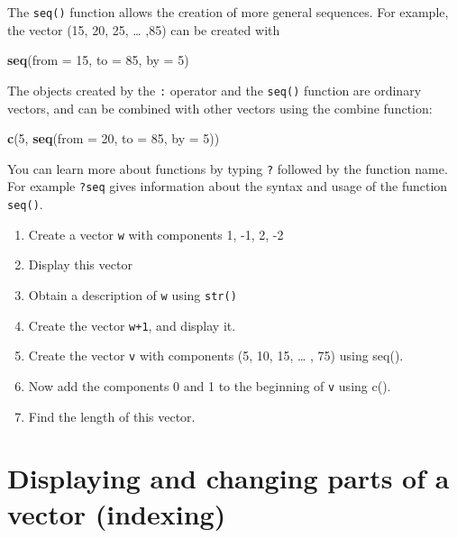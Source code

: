 \documentclass[
]{book}
\newenvironment{Shaded}{\begin{snugshade}}{\end{snugshade}}
\newcommand{\AttributeTok}[1]{\textcolor[rgb]{0.13,0.29,0.53}{#1}}
\newcommand{\DecValTok}[1]{\textcolor[rgb]{0.00,0.00,0.81}{#1}}
\newcommand{\FunctionTok}[1]{\textcolor[rgb]{0.13,0.29,0.53}{\textbf{#1}}}
\newcommand{\NormalTok}[1]{#1}
\begin{document}
The \texttt{seq()} function allows the creation of more general
sequences. For example, the vector (15, 20, 25, \ldots{} ,85) can be created
with

\begin{Shaded}
\begin{Highlighting}[]
\FunctionTok{seq}\NormalTok{(}\AttributeTok{from =} \DecValTok{15}\NormalTok{, }\AttributeTok{to =} \DecValTok{85}\NormalTok{, }\AttributeTok{by =} \DecValTok{5}\NormalTok{)}
\end{Highlighting}
\end{Shaded}

The objects created by the \texttt{:} operator and the \texttt{seq()} function
are ordinary vectors, and can be combined with other vectors using the
combine function:

\begin{Shaded}
\begin{Highlighting}[]
\FunctionTok{c}\NormalTok{(}\DecValTok{5}\NormalTok{, }\FunctionTok{seq}\NormalTok{(}\AttributeTok{from =} \DecValTok{20}\NormalTok{, }\AttributeTok{to =} \DecValTok{85}\NormalTok{, }\AttributeTok{by =} \DecValTok{5}\NormalTok{))}
\end{Highlighting}
\end{Shaded}

You can learn more about functions by typing \texttt{?} followed by the
function name. For example \texttt{?seq} gives information about the
syntax and usage of the function \texttt{seq()}.

\begin{enumerate}
\def\labelenumi{\arabic{enumi}.}
\item
  Create a vector \texttt{w} with components 1, -1, 2, -2
\item
  Display this vector
\item
  Obtain a description of \texttt{w} using \texttt{str()}
\item
  Create the vector \texttt{w+1}, and display it.
\item
  Create the vector \texttt{v} with components (5, 10, 15, \ldots{} , 75) using seq().
\item
  Now add the components 0 and 1 to the beginning of \texttt{v} using c().
\item
  Find the length of this vector.
\end{enumerate}

\section{Displaying and changing parts of a vector (indexing)}\label{displaying-and-changing-parts-of-a-vector-indexing}
\end{document}
